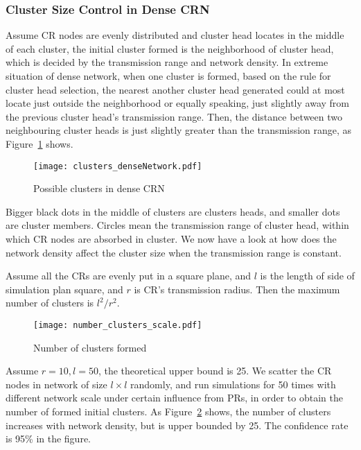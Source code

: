 \subsubsection{Cluster Size Control in Dense CRN}
\label{cluster_pruning}
Assume CR nodes are evenly distributed and cluster head locates in the middle of each cluster, the initial cluster formed is the neighborhood of cluster head, which is decided by the transmission range and network density.
In extreme situation of dense network, when one cluster is formed, based on the rule for cluster head selection, the nearest another cluster head generated could at most locate just outside the neighborhood or equally speaking, just slightly away from the previous cluster head's transmission range.
Then, the distance between two neighbouring cluster heads is just slightly greater than the transmission range, as Figure~\ref{clusters_denseNetwork} shows.
\begin{figure}[ht!]
  \centering
  \texttt{[image: clusters\_denseNetwork.pdf]}
  \caption{Possible clusters in dense CRN}
  \label{clusters_denseNetwork}
\end{figure}
Bigger black dots in the middle of clusters are clusters heads, and smaller dots are cluster members.
Circles mean the transmission range of cluster head, within which CR nodes are absorbed in cluster.
We now have a look at how does the network density affect the cluster size when the transmission range is constant.

Assume all the CRs are evenly put in a square plane, and $l$ is the length of side of simulation plan square, and $r$ is CR's transmission radius.
Then the maximum number of clusters is $l^2/r^2$.

\begin{figure}[ht!]
  \centering
  \texttt{[image: number\_clusters\_scale.pdf]}
  \caption{Number of clusters formed}
  \label{number_clusters_scale}
\end{figure}
Assume $r=10, l=50$, the theoretical upper bound is 25. 
We scatter the CR nodes in network of size $l\times l$ randomly, and run simulations for 50 times with different network scale under certain influence from PRs, in order to obtain the number of formed initial clusters.
As Figure~\ref{number_clusters_scale} shows, the number of clusters increases with network density, but is upper bounded by 25.
The confidence rate is 95\% in the figure.


